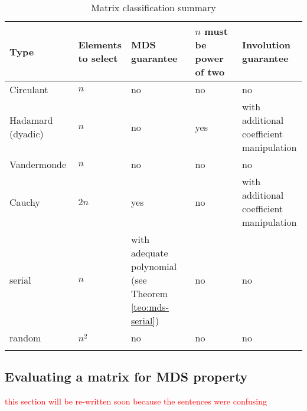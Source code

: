 \begin{footnotesize}
\begin{longtable}{|l|l|l|l|l|}
\hline
\textbf{Type} & \shortstack{\textbf{Elements} \\ \textbf{to select}} & \shortstack{\textbf{MDS} \\ \textbf{guarantee}} & \shortstack{\textbf{$n$ must be} \\ \textbf{power of two}} & \shortstack{\textbf{Involution} \\ \textbf{guarantee}} \\ \hline
\endfirsthead
%
\endhead
%
Circulant         & $n$ & no & no & no \\ \hline
Hadamard (dyadic) & $n$ & no & yes & \shortstack{with additional \\ coefficient \\ manipulation} \\ \hline
Vandermonde       & $n$ & no & no & no \\ \hline
Cauchy            & $2n$ & yes & no & \shortstack{with additional \\ coefficient \\ manipulation} \\ \hline
serial       & $n$ & \shortstack{with adequate \\ polynomial \\ (see Theorem \ref{teo:mds-serial})} & no & no \\ \hline
random            & $n^2$ & no & no & no \\ \hline
\caption{Matrix classification summary}
\label{tab:matrix-types}\\
\end{longtable}
\end{footnotesize}

\subsection{Evaluating a matrix for MDS property}
\textcolor{red}{this section will be re-written soon because the sentences were confusing}


